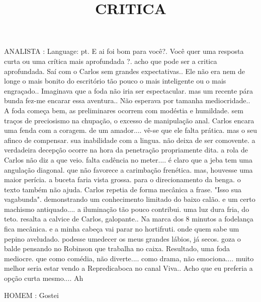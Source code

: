\documentclass[10pt]{article}
\author{}
\title{\vspace{-3.5cm}CRITICA}
\date{}
\newcommand{\mychar}[1]{
  \bigskip
  \hspace{-2em} \MakeUppercase{#1}
}
\begin{document}
\maketitle



\mychar{ANALISTA}: Language: pt. E ai foi bom para você?. Você quer uma resposta curta ou uma crítica mais aprofundada ?. acho que pode ser a critica aprofundada. Saí com o Carlos sem grandes expectativas.. Ele não era nem de longe o mais bonito do escritório tão pouco o mais inteligente ou o mais engraçado.. Imaginava que a foda não iria ser espectacular. mas um recente pára bunda fez-me encarar essa aventura.. Não esperava por tamanha mediocridade.. A foda começa bem, as preliminares ocorrem com modéstia e humildade. sem traços de preciosismo na chupação, o excesso de manipulação anal. Carlos encara uma fenda com a coragem. de um amador.... vê-se que ele falta prática. mas o seu afinco de compensar. sua inabilidade com a lingua. não deixa de ser comovente. a verdadeira decepção ocorre na hora da penetração propriamente dita. a rola de Carlos não diz a que veio. falta cadência no meter.... é claro que a jeba tem uma angulação diagonal. que não favorece a carimbação frenética. mas, houvesse uma maior perícia. a buceta faria vista grossa. para o direcionamento da benga. o texto também não ajuda. Carlos repetia de forma mecânica a frase. "Isso sua vagabunda". demonstrando um conhecimento limitado do baixo calão. e um certo machismo antiquado.... a iluminação tão pouco contribui. uma luz dura fria, do teto. resalta a calvice de Carlos, galopante.. Na marca dos 8 minutos a fodelança fica mecânica. e a minha cabeça vai parar no hortifruti. onde quem sabe um pepino aveludado. podesse umedecer os meus grandes lábios, já secos. goza o balde pensando no Robinson que trabalha no caixa. Resultado, uma foda mediocre. que como comédia, não diverte.... como drama, não emociona.... muito melhor seria estar vendo a Repredicaboca no canal Viva.. Acho que eu preferia a opção curta mesmo.... Ah

\mychar{HOMEM}: Gostei
\end{document}
